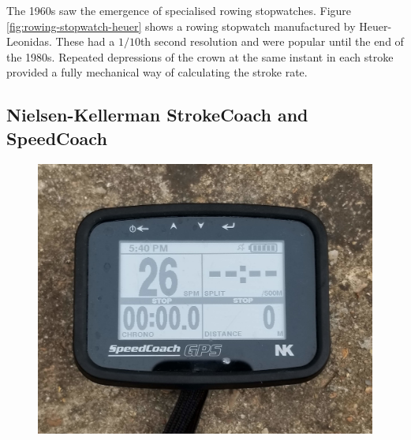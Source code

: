 \documentclass[11pt,twoside,a4paper]{report}
\begin{document}
The 1960s saw the emergence of specialised rowing stopwatches. Figure \ref{fig:rowing-stopwatch-heuer} shows a rowing stopwatch manufactured by Heuer-Leonidas. These had a $1/10$th second resolution and were popular until the end of the 1980s. Repeated depressions of the crown at the same instant in each stroke provided a fully mechanical way of calculating the stroke rate.

\subsection{Nielsen-Kellerman StrokeCoach and SpeedCoach}

\begin{figure}[h!]
  \centering
  \includegraphics[height=0.4\textheight]{strokecoach.jpg}

\end{figure}
\end{document}
